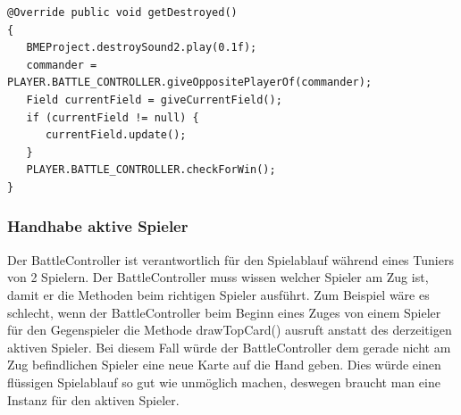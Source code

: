 \begin{lstlisting}
@Override public void getDestroyed()
{
   BMEProject.destroySound2.play(0.1f);
   commander = PLAYER.BATTLE_CONTROLLER.giveOppositePlayerOf(commander);
   Field currentField = giveCurrentField();
   if (currentField != null) {
      currentField.update();
   }
   PLAYER.BATTLE_CONTROLLER.checkForWin();
}
\end{lstlisting}

\subsubsection{Handhabe aktive Spieler}
Der BattleController ist verantwortlich für den Spielablauf während eines Tuniers von 2 Spielern. Der BattleController muss wissen welcher Spieler am Zug ist, damit er die Methoden beim richtigen Spieler ausführt. Zum Beispiel wäre es schlecht, wenn der BattleController beim Beginn eines Zuges von einem Spieler für den Gegenspieler die Methode drawTopCard() ausruft anstatt des derzeitigen aktiven Spieler. Bei diesem Fall würde der BattleController dem gerade nicht am Zug befindlichen Spieler eine neue Karte auf die Hand geben. Dies würde einen flüssigen Spielablauf so gut wie unmöglich machen, deswegen braucht man eine Instanz für den aktiven Spieler.

